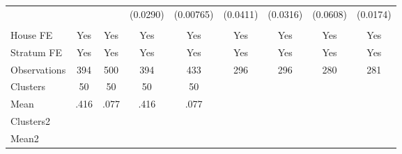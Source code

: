 {\begin{tabular}{l*{8}{c}}
                &         &         & (0.0290)&(0.00765)& (0.0411)& (0.0316)& (0.0608)& (0.0174)\\
                &         &         &         &         &         &         &         &         \\
House FE        &      Yes&      Yes&      Yes&      Yes&      Yes&      Yes&      Yes&      Yes\\
Stratum FE      &      Yes&      Yes&      Yes&      Yes&      Yes&      Yes&      Yes&      Yes\\
\midrule
Observations    &      394&      500&      394&      433&      296&      296&      280&      281\\
Clusters        &       50&       50&       50&       50&         &         &         &         \\
Mean            &     .416&     .077&     .416&     .077&         &         &         &         \\
Clusters2       &         &         &         &         &         &         &         &         \\
Mean2           &         &         &         &         &         &         &         &         \\
\bottomrule
\end{tabular}
}
